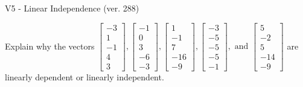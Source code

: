 \begin{exercise}
  \begin{exerciseTitle}V5 - Linear Independence (ver. 288)\end{exerciseTitle}
  \begin{exerciseStatement}
    Explain why the vectors \(\left[\begin{array}{r}
-3 \\
1 \\
-1 \\
4 \\
3
\end{array}\right] , \left[\begin{array}{r}
-1 \\
0 \\
3 \\
-6 \\
-3
\end{array}\right] , \left[\begin{array}{r}
1 \\
-1 \\
7 \\
-16 \\
-9
\end{array}\right] , \left[\begin{array}{r}
-3 \\
-5 \\
-5 \\
-5 \\
-1
\end{array}\right] , \text{ and } \left[\begin{array}{r}
5 \\
-2 \\
5 \\
-14 \\
-9
\end{array}\right]\) are linearly dependent or linearly independent.	



\end{exerciseStatement}
\end{exercise}
